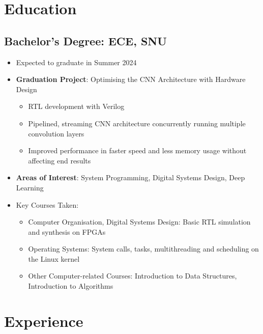 \documentclass[10pt]{article}
\begin{document}
\newpage
\restoregeometry
\pagestyle{stylemain}

\section*{Education} \label{edu}

\subsection*{Bachelor's Degree: ECE, SNU} \label{bachelor}
\begin{itemize}
  \item Expected to graduate in Summer 2024
  \item \textbf{Graduation Project}: Optimising the CNN Architecture with
    Hardware Design \label{edu:gradproj}
    \begin{itemize}
      \item RTL development with Verilog
      \item Pipelined, streaming CNN architecture concurrently running multiple
        convolution layers
      \item Improved performance in faster speed and less memory usage without
        affecting end results
    \end{itemize}
  \item \textbf{Areas of Interest}: System Programming, Digital Systems Design,
    Deep Learning
  \item[ ] Key Courses Taken:
    \begin{itemize}
      \item Computer Organisation, Digital Systems Design: Basic RTL simulation
        and synthesis on FPGAs
      \item Operating Systems: System calls, tasks, multithreading and
        scheduling on the Linux kernel
      \item Other Computer-related Courses: Introduction to Data Structures,
        Introduction to Algorithms
    \end{itemize}
\end{itemize}

\section*{Experience} \label{exp}
\end{document}
